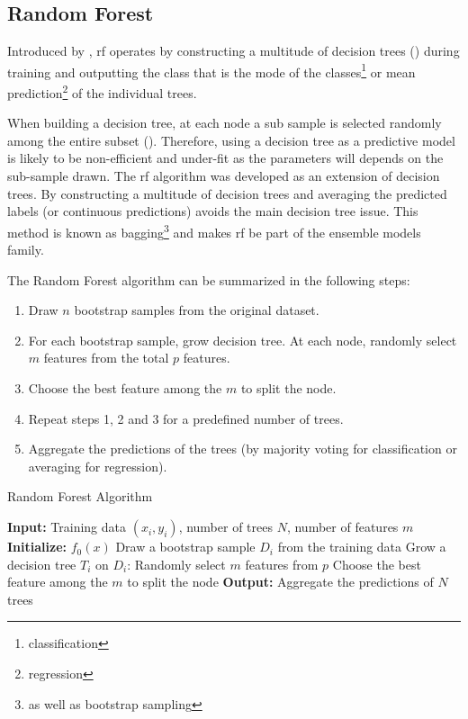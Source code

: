 \documentclass[12pt]{article}
\begin{document}
\newpage
\subsection{Random Forest}\label{subsec:Random forest}


 
Introduced by \cite{Breiman2001}, \acrlong{rf} operates by constructing a multitude of decision trees (\cite{DecisionTrees}) during training and outputting the class that is the mode of the classes\footnote{classification} or mean prediction\footnote{regression} of the individual trees. 

When building a decision tree, at each node a sub sample is selected randomly among the entire subset (\cite{LouppeRF}). Therefore, using a decision tree as a predictive model is likely to be non-efficient and under-fit as the parameters will depends on the sub-sample drawn. The \acrshort{rf} algorithm was developed as an extension of decision trees. By constructing a multitude of decision trees and averaging the predicted labels (or continuous predictions) avoids the main decision tree issue. This method is known as bagging\footnote{as well as bootstrap sampling} and makes \acrshort{rf} be part of the ensemble models family.\hfill \break

The Random Forest algorithm can be summarized in the following steps:
 
\begin{enumerate}
    \item Draw $n$ bootstrap samples from the original dataset.
    \item For each bootstrap sample, grow decision tree. At each node, randomly select $m$ features from the total $p$ features. \item Choose the best feature among the $m$ to split the node.
    \item Repeat steps 1, 2 and 3 for a predefined number of trees.
    \item Aggregate the predictions of the trees (by majority voting for classification or averaging for regression).
\end{enumerate}



\begin{algorithm}[H]
\caption{Random Forest Algorithm}
\begin{algorithmic}
\STATE \textbf{Input:} Training data $(x_i, y_i)$, number of trees $N$, number of features $m$
\STATE \textbf{Initialize:} $f_0(x)$
    \STATE Draw a bootstrap sample $D_i$ from the training data
    \STATE Grow a decision tree $T_i$ on $D_i$:
        \STATE Randomly select $m$ features from $p$
        \STATE Choose the best feature among the $m$ to split the node
    \ENDFOR
\ENDFOR
\STATE \textbf{Output:} Aggregate the predictions of $N$ trees
\end{algorithmic}
\end{algorithm}
 
\end{document}
